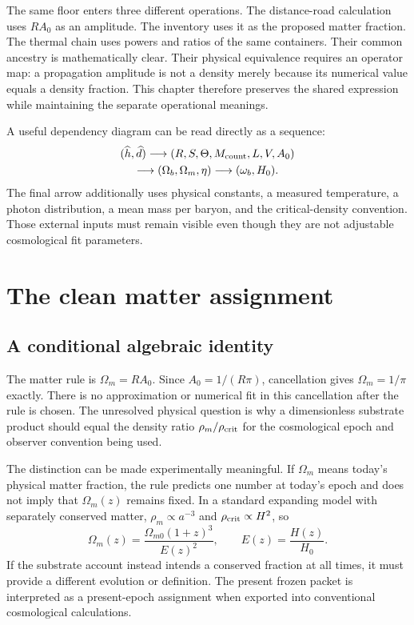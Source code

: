 The same floor enters three different operations. The distance-road calculation uses $RA_0$ as an amplitude. The inventory uses it as the proposed matter fraction. The thermal chain uses powers and ratios of the same containers. Their common ancestry is mathematically clear. Their physical equivalence requires an operator map: a propagation amplitude is not a density merely because its numerical value equals a density fraction. This chapter therefore preserves the shared expression while maintaining the separate operational meanings.

A useful dependency diagram can be read directly as a sequence:
\begin{equation}
 \begin{gathered}
 (\widehat h,\widehat d)\longrightarrow(R,S,\Theta,M_{\rm count},L,V,A_0)\\
 \longrightarrow(\Omega_b,\Omega_m,\eta)\longrightarrow(\omega_b,H_0).
 \end{gathered}
 \label{c8:dependency}
\end{equation}
The final arrow additionally uses physical constants, a measured temperature, a photon distribution, a mean mass per baryon, and the critical-density convention. Those external inputs must remain visible even though they are not adjustable cosmological fit parameters.

\section{The clean matter assignment}
\subsection{A conditional algebraic identity}
The matter rule is $\Omega_m=RA_0$. Since $A_0=1/(R\pi)$, cancellation gives $\Omega_m=1/\pi$ exactly. There is no approximation or numerical fit in this cancellation after the rule is chosen. The unresolved physical question is why a dimensionless substrate product should equal the density ratio $\rho_m/\rho_{\rm crit}$ for the cosmological epoch and observer convention being used.

The distinction can be made experimentally meaningful. If $\Omega_m$ means today's physical matter fraction, the rule predicts one number at today's epoch and does not imply that $\Omega_m(z)$ remains fixed. In a standard expanding model with separately conserved matter, $\rho_m\propto a^{-3}$ and $\rho_{\rm crit}\propto H^2$, so
\begin{equation}
 \Omega_m(z)=\frac{\Omega_{m0}(1+z)^3}{E(z)^2},
 \qquad E(z)=\frac{H(z)}{H_0}.
 \label{c8:omegaevolution}
\end{equation}
If the substrate account instead intends a conserved fraction at all times, it must provide a different evolution or definition. The present frozen packet is interpreted as a present-epoch assignment when exported into conventional cosmological calculations.

